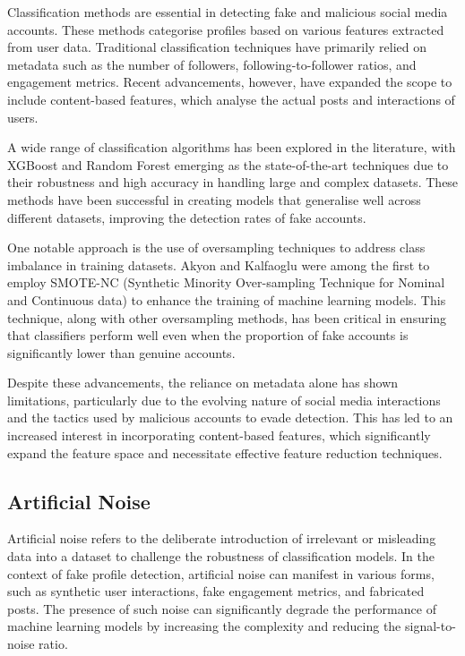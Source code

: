 \documentclass[conference]{IEEEtran}
\begin{document}
Classification methods are essential in detecting fake and malicious social media accounts. These methods categorise profiles based on various features extracted from user data. Traditional classification techniques have primarily relied on metadata such as the number of followers, following-to-follower ratios, and engagement metrics. Recent advancements, however, have expanded the scope to include content-based features, which analyse the actual posts and interactions of users.

A wide range of classification algorithms has been explored in the literature, with XGBoost and Random Forest emerging as the state-of-the-art techniques due to their robustness and high accuracy in handling large and complex datasets\cite{AkyonKalfaoglu2019,EkosputraEtAl2021,HarishEtAl2023,KaushikEtAl2022}. These methods have been successful in creating models that generalise well across different datasets, improving the detection rates of fake accounts.

One notable approach is the use of oversampling techniques to address class imbalance in training datasets. Akyon and Kalfaoglu\cite{AkyonKalfaoglu2019} were among the first to employ SMOTE-NC (Synthetic Minority Over-sampling Technique for Nominal and Continuous data) to enhance the training of machine learning models. This technique, along with other oversampling methods, has been critical in ensuring that classifiers perform well even when the proportion of fake accounts is significantly lower than genuine accounts.

Despite these advancements, the reliance on metadata alone has shown limitations, particularly due to the evolving nature of social media interactions and the tactics used by malicious accounts to evade detection. This has led to an increased interest in incorporating content-based features, which significantly expand the feature space and necessitate effective feature reduction techniques\cite{EzarfelixEtAl2022}.

\subsection{Artificial Noise}

Artificial noise refers to the deliberate introduction of irrelevant or misleading data into a dataset to challenge the robustness of classification models. In the context of fake profile detection, artificial noise can manifest in various forms, such as synthetic user interactions, fake engagement metrics, and fabricated posts. The presence of such noise can significantly degrade the performance of machine learning models by increasing the complexity and reducing the signal-to-noise ratio.
\end{document}

